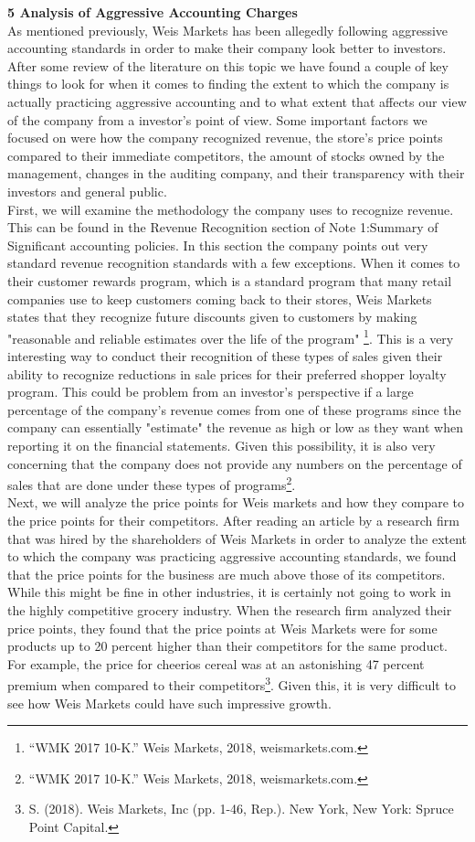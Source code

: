 \documentclass[12pt]{article}
\begin{document}
\begin{doublespacing}
\textbf{5 Analysis of Aggressive Accounting Charges}
\\
As mentioned previously, Weis Markets has been allegedly following aggressive accounting standards in order to make their company look better to investors. After some review of the literature on this topic we have found a couple of key things to look for when it comes to finding the extent to which the company is actually practicing aggressive accounting and to what extent that affects our view of the company from a investor's point of view. Some important factors we focused on were how the company recognized revenue, the store's price points compared to their immediate competitors, the amount of stocks owned by the management, changes in the auditing company, and their transparency with their investors and general public. 
\\
First, we will examine the methodology the company uses to recognize revenue. This can be found in the Revenue Recognition section of Note 1:Summary of Significant accounting policies. In this section the company points out very standard revenue recognition standards with a few exceptions. When it comes to their customer rewards program, which is a standard program that many retail companies use to keep customers coming back to their stores, Weis Markets states that they recognize future discounts given to customers by making "reasonable and reliable estimates over the life of the program" \footnote{“WMK 2017 10-K.” Weis Markets, 2018, weismarkets.com.}. This is a very interesting way to conduct their recognition of these types of sales given their ability to recognize reductions in sale prices for their preferred shopper loyalty program. This could be problem from an investor's perspective if a large percentage of the company's revenue comes from one of these programs since the company can essentially "estimate" the revenue as high or low as they want when reporting it on the financial statements. Given this possibility, it is also very concerning that the company does not provide any numbers on the percentage of sales that are done under these types of programs\footnote{“WMK 2017 10-K.” Weis Markets, 2018, weismarkets.com.}.
\\
Next, we will analyze the price points for Weis markets and how they compare to the price points for their competitors. After reading an article by a research firm that was hired by the shareholders of Weis Markets in order to analyze the extent to which the company was practicing aggressive accounting standards, we found that the price points for the business are much above those of its competitors. While this might be fine in other industries, it is certainly not going to work in the highly competitive grocery industry. When the research firm analyzed their price points, they found that the price points at Weis Markets were for some products up to 20 percent higher than their competitors for the same product. For example, the price for cheerios cereal was at an astonishing 47 percent premium when compared to their competitors\footnote{S. (2018). Weis Markets, Inc (pp. 1-46, Rep.). New York, New York: Spruce Point Capital.}. Given this, it is very difficult to see how Weis Markets could have such impressive growth. 


\end{doublespacing}
\end{document}
